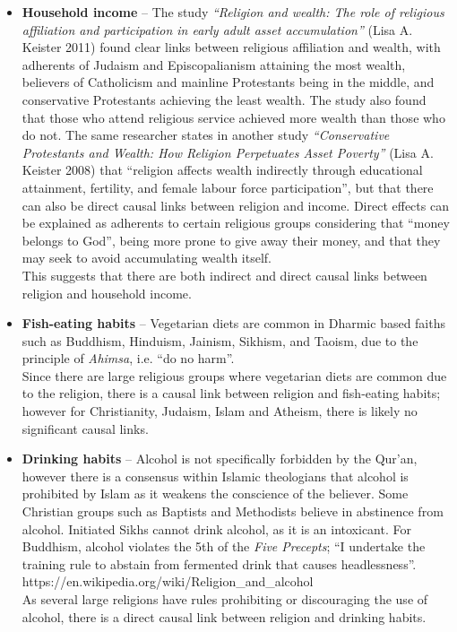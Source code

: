 \begin{itemize}
\begin{itemize}
\item \textbf{Household income} -- The study \textit{``Religion and wealth: The role of religious affiliation and participation in early adult asset accumulation''} (Lisa A. Keister 2011) found clear links between religious affiliation and wealth, with adherents of Judaism and Episcopalianism attaining the most wealth, believers of Catholicism and mainline Protestants being in the middle, and conservative Protestants achieving the least wealth. The study also found that those who attend religious service achieved more wealth than those who do not. The same researcher states in another study \textit{``Conservative Protestants and Wealth: How Religion Perpetuates Asset Poverty''} (Lisa A. Keister 2008) that ``religion affects wealth indirectly through educational attainment, fertility, and female labour force participation'', but that there can also be direct causal links between religion and income. Direct effects can be explained as adherents to certain religious groups considering that ``money belongs to God'', being more prone to give away their money, and that they may seek to avoid accumulating wealth itself.\\This suggests that there are both indirect and direct causal links between religion and household income.
\item \textbf{Fish-eating habits} -- Vegetarian diets are common in Dharmic based faiths such as Buddhism, Hinduism, Jainism, Sikhism, and Taoism, due to the principle of \textit{Ahimsa}, i.e. ``do no harm''.\\
Since there are large religious groups where vegetarian diets are common due to the religion, there is a causal link between religion and fish-eating habits; however for Christianity, Judaism, Islam and Atheism, there is likely no significant causal links.
\item \textbf{Drinking habits} -- Alcohol is not specifically forbidden by the Qur'an, however there is a consensus within Islamic theologians that alcohol is prohibited by Islam as it weakens the conscience of the believer. Some Christian groups such as Baptists and Methodists believe in abstinence from alcohol. Initiated Sikhs cannot drink alcohol, as it is an intoxicant. For Buddhism, alcohol violates the 5th of the \textit{Five Precepts}; ``I undertake the training rule to abstain from fermented drink that causes headlessness''.\\https://en.wikipedia.org/wiki/Religion\_and\_alcohol\\As several large religions have rules prohibiting or discouraging the use of alcohol, there is a direct causal link between religion and drinking habits.

\end{itemize}
\end{itemize}

